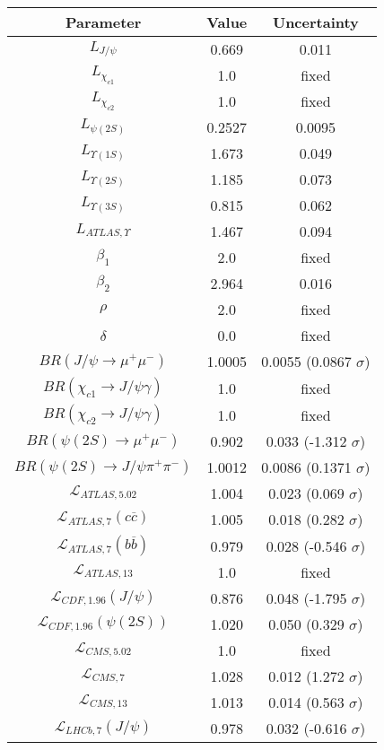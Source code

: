 \begin{table}[h!]
\centering
\begin{tabular}{c|c|c}
Parameter & Value & Uncertainty \\
\hline
$L_{J/\psi}$ & 0.669 & 0.011 \\
$L_{\chi_{c1}}$ & 1.0 & fixed \\
$L_{\chi_{c2}}$ & 1.0 & fixed \\
$L_{\psi(2S)}$ & 0.2527 & 0.0095 \\
$L_{\Upsilon(1S)}$ & 1.673 & 0.049 \\
$L_{\Upsilon(2S)}$ & 1.185 & 0.073 \\
$L_{\Upsilon(3S)}$ & 0.815 & 0.062 \\
$L_{ATLAS,\Upsilon}$ & 1.467 & 0.094 \\
$\beta_1$ & 2.0 & fixed \\
$\beta_2$ & 2.964 & 0.016 \\
$\rho$ & 2.0 & fixed \\
$\delta$ & 0.0 & fixed \\
$BR(J/\psi\rightarrow\mu^+\mu^-)$ & 1.0005 & 0.0055 (0.0867 $\sigma$) \\
$BR(\chi_{c1}\rightarrow J/\psi\gamma)$ & 1.0 & fixed \\
$BR(\chi_{c2}\rightarrow J/\psi\gamma)$ & 1.0 & fixed \\
$BR(\psi(2S)\rightarrow\mu^+\mu^-)$ & 0.902 & 0.033 (-1.312 $\sigma$) \\
$BR(\psi(2S)\rightarrow J/\psi\pi^+\pi^-)$ & 1.0012 & 0.0086 (0.1371 $\sigma$) \\
$\mathcal L_{ATLAS,5.02}$ & 1.004 & 0.023 (0.069 $\sigma$) \\
$\mathcal L_{ATLAS,7}(c\overline c)$ & 1.005 & 0.018 (0.282 $\sigma$) \\
$\mathcal L_{ATLAS,7}(b\overline b)$ & 0.979 & 0.028 (-0.546 $\sigma$) \\
$\mathcal L_{ATLAS,13}$ & 1.0 & fixed \\
$\mathcal L_{CDF,1.96}(J/\psi)$ & 0.876 & 0.048 (-1.795 $\sigma$) \\
$\mathcal L_{CDF,1.96}(\psi(2S))$ & 1.020 & 0.050 (0.329 $\sigma$) \\
$\mathcal L_{CMS,5.02}$ & 1.0 & fixed \\
$\mathcal L_{CMS,7}$ & 1.028 & 0.012 (1.272 $\sigma$) \\
$\mathcal L_{CMS,13}$ & 1.013 & 0.014 (0.563 $\sigma$) \\
$\mathcal L_{LHCb,7}(J/\psi)$ & 0.978 & 0.032 (-0.616 $\sigma$) \\

\end{tabular}
\end{table}
